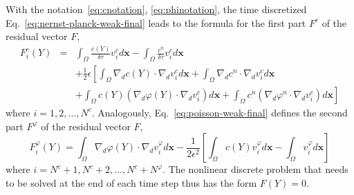 With the notation~\eqref{eq:cnotation}, \eqref{eq:phinotation}, the time discretized 
Eq.~\eqref{eq:nernst-planck-weak-final} leads to the formula for the 
first part $F^c$ of the residual vector $F$,
\begin{eqnarray}
  F_i^c\left(Y\right) & = & \int_{\Omega} \frac{c(Y)}{\delta\tau}v_i^c d\mathbf{x} - 
  \int_{\Omega} \frac{c^{n}}{\delta\tau}v_i^c d\mathbf{x}\nonumber\\
  &&+\frac 12 \epsilon \left[\int_{\Omega} \nabla_d c(Y) \cdot \nabla_d v_i^c d\mathbf{x}+ 
  	\int_{\Omega} \nabla_d c^{n} \cdot \nabla_d v_i^c d\mathbf{x}\right.\nonumber\\
  &&+ \left.\int_{\Omega}c(Y) \left(\nabla_d \varphi(Y) \cdot \nabla_d v_i^c\right) d\mathbf{x}+
  \int_{\Omega}c^{n} \left(\nabla_d \varphi^{n} \cdot \nabla_d v_i^c\right) d\mathbf{x}\right]\label{eq:Fc}
\end{eqnarray}
where $i = 1, 2, \ldots, N^c$.
Analogously, Eq.~\eqref{eq:poisson-weak-final} defines the second part $F^{\varphi}$ 
of the residual vector $F$,
\begin{equation}
  F_i^{\varphi}\left(Y\right) = \int_{\Omega} \nabla_d \varphi(Y) \cdot \nabla_d v_i^{\varphi} d\mathbf{x} 
  -\frac{1}{2\epsilon^2}\left[ \int_{\Omega} c(Y)v_i^{\varphi} d\mathbf{x} -
   \int_{\Omega} v_i^{\varphi} d\mathbf{x}\right]
  \label{eq:Fphi}
\end{equation}
where $i = N^c + 1, N^c + 2, \ldots, N^c + N^{\varphi}$. The nonlinear discrete problem 
that needs to be solved at the end of each time step thus has the form 
$F(Y) = 0$.

